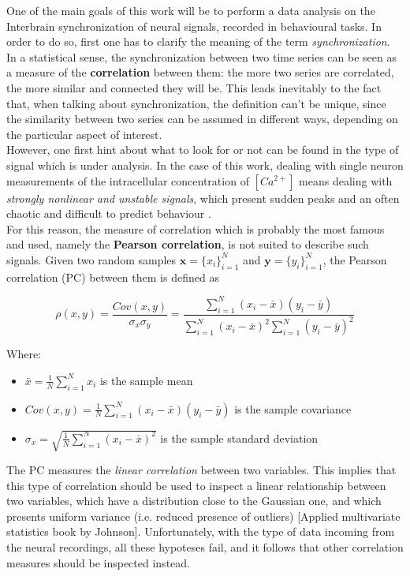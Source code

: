 \documentclass[a4paper]{article}
\begin{document}
One of the main goals of this work will be to perform a data analysis on the Interbrain synchronization of neural signals, recorded in behavioural tasks. In order to do so, first one has to clarify the meaning of the term  \textit{synchronization}.\\
In a statistical sense, the synchronization between two time series can be seen as a measure of the \textbf{correlation} between them: the more two series are correlated, the more similar and connected they will be. This leads inevitably to the fact that, when talking about synchronization, the definition can't be unique, since the similarity between two series can be assumed in different ways, depending on the particular aspect of interest. \\
However, one first hint about what to look for or not can be found in the type of signal which is under analysis. In the case of this work, dealing with single neuron measurements of the intracellular concentration of $[Ca^{2+}]$ means dealing with \textit{strongly nonlinear and unstable signals}, which present sudden peaks and an often chaotic and difficult to predict behaviour .\\
For this reason, the measure of correlation which is probably the most famous and used, namely the \textbf{Pearson correlation}, is not suited to describe such signals. Given two random samples $ \textbf{x} = \{x_i\}_{i=1}^N$ and  $ \textbf{y} = \{y_i\}_{i=1}^N$, the Pearson correlation (PC) between them is defined as

$$ \rho(x,y) = \frac{Cov(x,y)}{\sigma_x \sigma_y} = \frac{\sum_{i=1}^{N}(x_i-\bar{x}) (y_i-\bar{y})} {\sum_{i=1}^{N}(x_i-\bar{x})^2 \sum_{i=1}^{N} (y_i-\bar{y})^2} $$

Where:
\begin{itemize}
	\item $ \bar{x} = \frac{1}{N}\sum_{i=1}^{N}x_i$ is the sample mean
	
	\item $Cov(x,y) = \frac{1}{N}\sum_{i=1}^{N}(x_i-\bar{x}) (y_i-\bar{y})$ is the sample covariance
	
	\item $\sigma_x = \sqrt{\frac{1}{N}\sum_{i=1}^{N}(x_i-\bar{x})^2}$ is the sample standard deviation
\end{itemize}

The PC measures the \textit{linear correlation} between two variables. This implies that this type of correlation should be used to inspect a linear relationship between two variables, which have a distribution close to the Gaussian one, and which presents uniform variance (i.e. reduced presence of outliers) [Applied multivariate statistics book by Johnson]. Unfortunately, with the type of data incoming from the neural recordings, all these hypoteses fail, and it follows that other correlation measures should be inspected instead.
\end{document}
